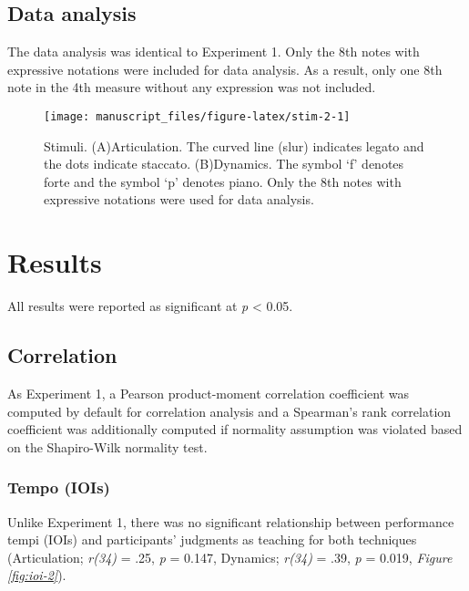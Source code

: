 \documentclass[
  man,floatsintext]{apa6}
\begin{document}
\hypertarget{dataanalysis2}{%
\subsection{Data analysis}\label{dataanalysis2}}

The data analysis was identical to Experiment 1. Only the 8th notes with expressive notations were included for data analysis. As a result, only one 8th note in the 4th measure without any expression was not included.

\begin{figure}
\texttt{[image: manuscript\_files/figure-latex/stim-2-1]} \caption{\label{fig:stim2}Stimuli. (A)Articulation. The curved line (slur) indicates legato and the dots indicate staccato. (B)Dynamics. The symbol `f' denotes forte and the symbol `p' denotes piano. Only the 8th notes with expressive notations were used for data analysis.}\label{fig:stim-2}
\end{figure}

\hypertarget{results-1}{%
\section{Results}\label{results-1}}

All results were reported as significant at \emph{p} \textless{} 0.05.

\hypertarget{correlation-1}{%
\subsection{Correlation}\label{correlation-1}}

As Experiment 1, a Pearson product-moment correlation coefficient was computed by default for correlation analysis and a Spearman's rank correlation coefficient was additionally computed if normality assumption was violated based on the Shapiro-Wilk normality test.

\hypertarget{tempo-iois-1}{%
\subsubsection{Tempo (IOIs)}\label{tempo-iois-1}}

Unlike Experiment 1, there was no significant relationship between performance tempi (IOIs) and participants' judgments as teaching for both techniques (Articulation; \emph{r(34)} = .25, \emph{p} = 0.147, Dynamics; \emph{r(34)} = .39, \emph{p} = 0.019, \emph{Figure \ref{fig:ioi-2}}).
\end{document}
